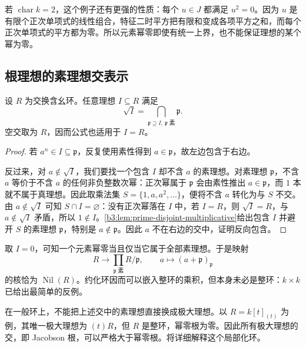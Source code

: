 \ProseParagraphBreak
若 \(\operatorname{char}k=2\)，这个例子还有更强的性质：每个 \(u\in J\) 都满足 \(u^2=0\)。因为 \(u\) 是有限个正次单项式的线性组合，特征二时平方把有限和变成各项平方之和，而每个正次单项式的平方都为零。所以元素幂零即使有统一上界，也不能保证理想的某个幂为零。

\subsection{根理想的素理想交表示}
\label{b3:subsec:0102:02}

\begin{theorem}\label{b3:thm:radical-prime-intersection}
	设 \(R\) 为交换含幺环。任意理想 \(I\subseteq R\) 满足
	\begin{equation}\label{b3:eq:radical-prime-intersection}
		\sqrt I=\bigcap_{\mathfrak p\supseteq I,\ \mathfrak p\;\text{素}}\mathfrak p.
	\end{equation}
	空交取为 \(R\)，因而公式也适用于 \(I=R\)。
\end{theorem}
\begin{proof}
	若 \(a^n\in I\subseteq\mathfrak p\)，反复使用素性得到 \(a\in\mathfrak p\)，故左边包含于右边。

	反过来，对 \(a\notin\sqrt I\)，我们要找一个包含 \(I\) 却不含 \(a\) 的素理想。对素理想 \(\mathfrak p\)，不含 \(a\) 等价于不含 \(a\) 的任何非负整数次幂：正次幂属于 \(\mathfrak p\) 会由素性推出 \(a\in\mathfrak p\)，而 \(1\) 本就不属于真理想。因此取乘法集 \(S=\{1,a,a^2,\ldots\}\)，便将不含 \(a\) 转化为与 \(S\) 不交。由 \(a\notin\sqrt I\) 可知 \(S\cap I=\varnothing\)：没有正次幂落在 \(I\) 中，若 \(I=R\)，则 \(\sqrt I=R\)，与 \(a\notin\sqrt I\) 矛盾，所以 \(1\notin I\)。\cref{b3:lem:prime-disjoint-multiplicative}给出包含 \(I\) 并避开 \(S\) 的素理想 \(\mathfrak p\)，特别是 \(a\notin\mathfrak p\)。因此 \(a\) 不在右边的交中，证明反向包含。
\end{proof}

取 \(I=0\)，可知一个元素幂零当且仅当它属于全部素理想。于是映射
\[
	R\longrightarrow\prod_{\mathfrak p\;\text{素}}R/\mathfrak p, \qquad a\longmapsto(a+\mathfrak p)_{\mathfrak p}
\]
的核恰为 \(\operatorname{Nil}(R)\)。约化环因而可以嵌入整环的乘积，但本身未必是整环：\(k\times k\) 已给出最简单的反例。

\ProseParagraphBreak
在一般环上，不能把上述交中的素理想直接换成极大理想。以 \(R=k[t]_{(t)}\) 为例，其唯一极大理想为 \((t)R\)，但 \(R\) 是整环，幂零根为零。因此所有极大理想的交，即 Jacobson 根，可以严格大于幂零根。将详细解释这个局部化环。

